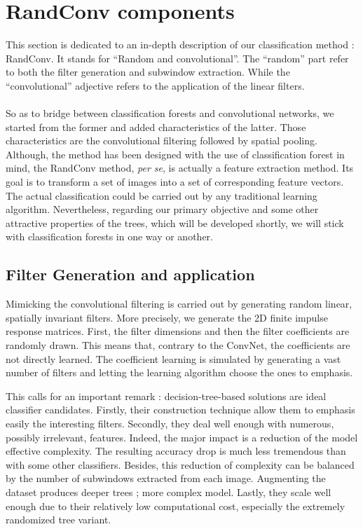 \documentclass[a4paper]{report}
\begin{document}
	\section{RandConv components}
	This section is dedicated to an in-depth description of our classification method : RandConv. It stands for ``Random and 	convolutional''. The ``random'' part refer to both the filter generation and subwindow extraction. While the ``convolutional'' adjective refers to the application of the linear filters. 
	\paragraph{}
	So as to bridge between classification forests and convolutional networks, we started from the former and added characteristics of the latter. Those characteristics are the convolutional filtering followed by spatial pooling.
	Although, the method has been designed with the use of classification forest in mind, the RandConv method, \textit{per se}, is actually a feature extraction method. Its goal is to transform a set of images into a set of corresponding feature vectors. The actual classification could be carried out by any traditional learning algorithm. Nevertheless, regarding our primary objective and some other attractive properties of the trees, which will be developed shortly, we will stick with classification forests in one way or another.

	
		\subsection{Filter Generation and application}\label{subsec:methodo-filtergen}
		Mimicking the convolutional filtering is carried out by generating random linear, spatially invariant filters. More precisely, we generate the 2D finite impulse response matrices. First, the filter dimensions and then the filter coefficients are randomly drawn. This means that, contrary to the ConvNet, the coefficients are not directly learned. The coefficient learning is simulated by generating a vast number of filters and letting the learning algorithm choose the ones to emphasis. 
		\par
		This calls for an important remark : decision-tree-based solutions are ideal classifier candidates. Firstly, their construction technique allow them to emphasis easily the interesting filters. Secondly, they deal well enough with numerous, possibly irrelevant, features. Indeed, the major impact is a reduction of the model effective complexity. The resulting accuracy drop is much less tremendous than with some other classifiers. Besides, this reduction of complexity can be balanced by the number of subwindows extracted from each image. Augmenting the dataset produces deeper trees ; more complex model. Lastly, they scale well enough due to their relatively low computational cost, especially the extremely randomized tree variant.
		
\end{document}
